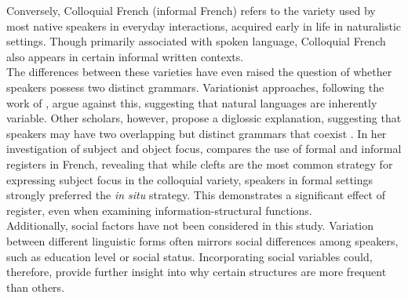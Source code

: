 Conversely, Colloquial French (informal French) refers to the variety used by most native speakers in everyday interactions, acquired early in life in naturalistic settings. Though primarily associated with spoken language, Colloquial French also appears in certain informal written contexts. \\
The differences between these varieties have even raised the question of whether speakers possess two distinct grammars. Variationist approaches, following the work of \textcite{labov1972sociolinguistic}, argue against this, suggesting that natural languages are inherently variable. Other scholars, however, propose a diglossic explanation, suggesting that speakers may have two overlapping but distinct grammars that coexist \parencite{rowlett2011syntactic}.
In her investigation of subject and object focus, \textcite{destruel2016focus} compares the use of formal and informal registers in French, revealing that while clefts are the most common strategy for expressing subject focus in the colloquial variety, speakers in formal settings strongly preferred the \textit{in situ} strategy. This demonstrates a significant effect of register, even when examining information-structural functions.\\
Additionally, social factors have not been considered in this study. Variation between different linguistic forms often mirrors social differences among speakers, such as education level or social status. Incorporating social variables could, therefore, provide further insight into why certain structures are more frequent than others.

